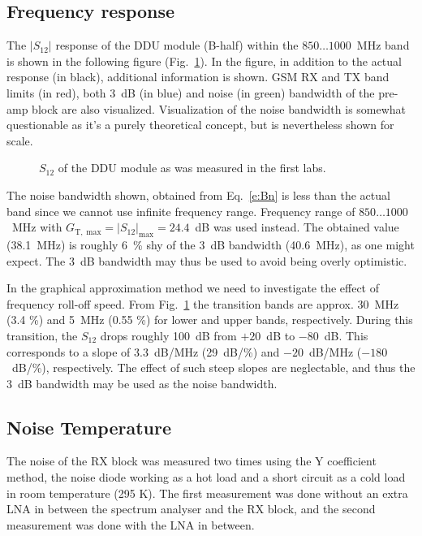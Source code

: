 \documentclass[a4paper, 12pt]{article}
\begin{document}
\newpage
\subsection{Frequency response}

The $|S_{12}|$ response of the DDU module (B-half) within the $850 \ldots 1000$~MHz band 
is shown in the following figure (Fig.~\ref{f:s12}). In the figure, in addition to the 
actual response (in black), additional information is shown. GSM RX and TX band limits 
(in red), both 3~dB (in blue) and noise (in green) bandwidth of the pre-amp block are also 
visualized. Visualization of the noise bandwidth is somewhat questionable as it's a purely 
theoretical concept, but is nevertheless shown for scale. 

\begin{figure}[h!]
	\begin{center}
	\caption{$S_{12}$ of the DDU module as was measured in the first labs.}
	\label{f:s12}
	\end{center}
	\vspace*{-12pt}
\end{figure}

The noise bandwidth shown, obtained from Eq.~\ref{e:Bn} is less than the actual band since 
we cannot use infinite frequency range. Frequency range of $850 \ldots 1000$~MHz with
$G_\mathrm{T,\;max} = |S_{12}|_\mathrm{max} = 24.4$~dB was used instead. The obtained 
value (38.1~MHz) is roughly 6~\% shy of the 3~dB bandwidth (40.6~MHz), as one might expect.
The 3~dB bandwidth may thus be used to avoid being overly optimistic.

In the graphical approximation method we need to investigate the effect of frequency 
roll-off speed. From Fig.~\ref{f:s12} the transition bands are approx. 30~MHz (3.4 \%) 
and 5~MHz (0.55 \%) for lower and upper bands, respectively. During this transition, 
the $S_12$ drops roughly 100~dB from $+20$~dB to $-80$~dB. This corresponds to a slope 
of $3.3$~dB/MHz (29~dB/\%) and $-20$~dB/MHz ($-180$~dB/\%), respectively. The effect of 
such steep slopes are neglectable, and thus the 3~dB bandwidth may be used as the noise 
bandwidth.


\subsection{Noise Temperature}

\noindent
The noise of the RX block was measured two times using the Y coefficient method, the noise diode
working as a hot load and a short circuit as a cold load in room temperature (295 K). The first measurement was done without an extra LNA in between the spectrum analyser and the RX block, and the second measurement was done with the LNA in between.
\end{document}
